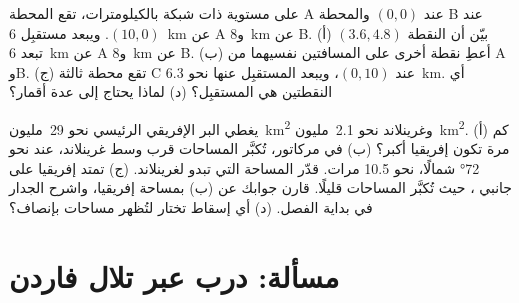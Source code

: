 \begin{exercise}[$\star\star\star$]\label{exo:g9:maps-of-the-earth:11}
على  مستوية ذات شبكة بالكيلومترات، تقع المحطة A عند $(0, 0)$
والمحطة B عند $(10, 0)$. ويبعد مستقبِل \qty{6}{km} عن A و\qty{8}{km} عن
B. (أ) بيّن أن النقطة $(3.6, 4.8)$ تبعد \qty{6}{km} عن A و\qty{8}{km} عن
B. (ب) أعطِ نقطة أخرى على المسافتين نفسيهما من A وB. (ج) تقع محطة ثالثة C
عند $(0, 10)$، ويبعد المستقبِل عنها نحو \qty{6.3}{km}. أي النقطتين هي
المستقبِل؟ (د) لماذا يحتاج  إلى عدة
أقمار؟
\end{exercise}

\begin{exercise}[$\star\star\star$]\label{exo:g9:maps-of-the-earth:12}
يغطي البر الإفريقي الرئيسي نحو 29~مليون~\unit{km^2} وغرينلاند نحو
2.1~مليون~\unit{km^2}. (أ) كم مرة تكون إفريقيا أكبر؟ (ب) في  مركاتور،
تُكبَّر المساحات قرب وسط غرينلاند، عند نحو \ang{72} شمالًا، نحو 10.5 مرات.
قدّر المساحة التي تبدو لغرينلاند. (ج) تمتد إفريقيا على جانبي ،
حيث تُكبَّر المساحات قليلًا. قارن جوابك عن (ب) بمساحة إفريقيا، واشرح
 الجدار في بداية الفصل. (د) أي إسقاط تختار لتُظهر مساحات 
بإنصاف؟
\end{exercise}

\section{مسألة: درب عبر تلال فاردن}

